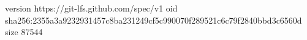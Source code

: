 version https://git-lfs.github.com/spec/v1
oid sha256:2355a3a9232931457c8ba231249cf5c990070f289521c6c79f2840bbd3c6560d
size 87544
